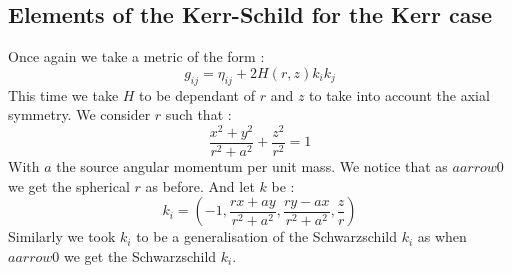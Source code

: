 \documentclass[a4paper,12pt]{article}
\theoremstyle{definition}
\begin{document}
\subsection{Elements of the Kerr-Schild for the Kerr case}
Once again we take a metric of the form :
\begin{equation}
	g_{ij}=\eta_{ij}+2H(r,z)k_ik_j
\end{equation}
This time we take $H$ to be dependant of $r$ and $z$ to take into account the axial symmetry.
We consider $r$ such that :
\begin{equation}
	\frac{x^2+y^2}{r^2+a^2}+\frac{z^2}{r^2}=1
\end{equation}
With $a$ the source angular momentum per unit mass.
We notice that as $a arrow 0$ we get the spherical $r$ as before.
And let $k$ be :
\begin{equation}
	k_i=(-1,\frac{r x + a y}{r^2 + a^2},\frac{ry-ax}{r^2+a^2},\frac{z}{r})
\end{equation}
Similarly we took $k_i$ to be a generalisation of the Schwarzschild $k_i$ as when $a arrow 0$ we get the Schwarzschild $k_i$.
\end{document}
